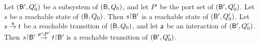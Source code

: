 \bco \label{cor.bip.reachability}
\label{cor:bip.reachability}
Let $(\mathsf{B}', Q'_0)$ be a subsystem of $(\mathsf{B}, Q_0)$, and let $P'$ be the port set of $(\mathsf{B}', Q'_0)$.
Let $s$ be a reachable state of $(\mathsf{B}, Q_0)$. Then $s \pj \B'$ is a reachable state of  $(\mathsf{B}',Q'_0)$. Let $s \stackrel{\mathsf{a}}{\rightarrow} t$ be
a reachable transition of $(\mathsf{B}, Q_0)$, and let $\mathsf{a}$ be an interaction of
 $(\mathsf{B}', Q'_0)$. Then  $s \pj \B' \la{\act \ints P'} t \pj \B'$ is a reachable transition of $(\mathsf{B}', Q'_0)$.
\eco
{}






